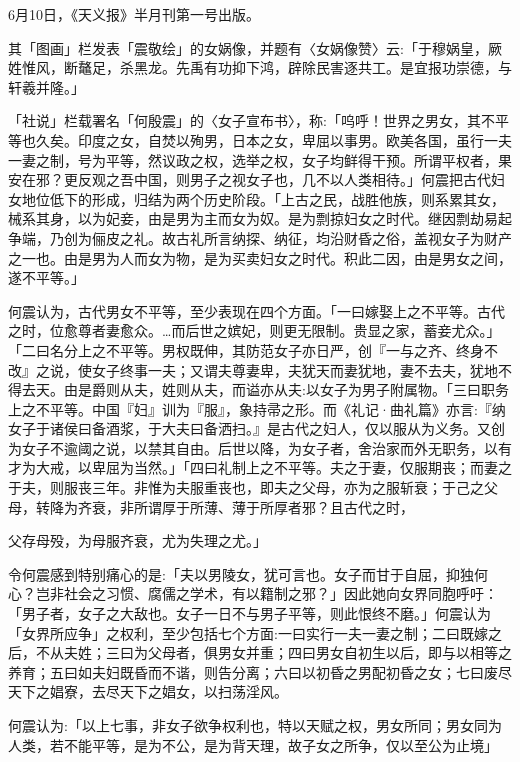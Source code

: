 6月10日，《天义报》半月刊第一号出版。

其「图画」栏发表「震敬绘」的女娲像，并题有〈女娲像赞〉云:「于穆娲皇，厥姓惟风，断鼇足，杀黑龙。先禹有功抑下鸿，辟除民害逐共工。是宜报功崇德，与轩羲并隆。」

「社说」栏载署名「何殷震」的〈女子宣布书〉，称:「呜呼！世界之男女，其不平等也久矣。印度之女，自焚以殉男，日本之女，卑屈以事男。欧美各国，虽行一夫一妻之制，号为平等，然议政之权，选举之权，女子均鲜得干预。所谓平权者，果安在邪？更反观之吾中国，则男子之视女子也，几不以人类相待。」何震把古代妇女地位低下的形成，归结为两个历史阶段。「上古之民，战胜他族，则系累其女，械系其身，以为妃妾，由是男为主而女为奴。是为剽掠妇女之时代。继因剽劫易起争端，乃创为俪皮之礼。故古礼所言纳探、纳征，均沿财昏之俗，盖视女子为财产之一也。由是男为人而女为物，是为买卖妇女之时代。积此二因，由是男女之间，遂不平等。」

何震认为，古代男女不平等，至少表现在四个方面。「一曰嫁娶上之不平等。古代之时，位愈尊者妻愈众。…而后世之嫔妃，则更无限制。贵显之家，蓄妾尤众。」「二曰名分上之不平等。男权既伸，其防范女子亦日严，创『一与之齐、终身不改』之说，使女子终事一夫；又谓夫尊妻卑，夫犹天而妻犹地，妻不去夫，犹地不得去天。由是爵则从夫，姓则从夫，而谥亦从夫:以女子为男子附属物。「三曰职务上之不平等。中国『妇』训为『服』，象持帚之形。而《礼记·曲礼篇》亦言:『纳女子于诸侯曰备酒浆，于大夫曰备洒扫。』是古代之妇人，仅以服从为义务。又创为女子不逾阈之说，以禁其自由。后世以降，为女子者，舍治家而外无职务，以有才为大戒，以卑屈为当然。」「四曰礼制上之不平等。夫之于妻，仅服期丧；而妻之于夫，则服丧三年。非惟为夫服重丧也，即夫之父母，亦为之服斩衰；于己之父母，转降为齐衰，非所谓厚于所薄、薄于所厚者邪？且古代之时，


\noindent 父存母殁，为母服齐衰，尤为失理之尤。」

令何震感到特别痛心的是:「夫以男陵女，犹可言也。女子而甘于自屈，抑独何心？岂非社会之习惯、腐儒之学术，有以籍制之邪？」因此她向女界同胞呼吁：「男子者，女子之大敌也。女子一日不与男子平等，则此恨终不磨。」何震认为「女界所应争」之权利，至少包括七个方面:一曰实行一夫一妻之制；二曰既嫁之后，不从夫姓；三曰为父母者，俱男女并重；四曰男女自初生以后，即与以相等之养育；五曰如夫妇既昏而不谐，则告分离；六曰以初昏之男配初昏之女；七曰废尽天下之娼寮，去尽天下之娼女，以扫荡淫风。

何震认为:「以上七事，非女子欲争权利也，特以天赋之权，男女所同；男女同为人类，若不能平等，是为不公，是为背天理，故子女之所争，仅以至公为止境」


